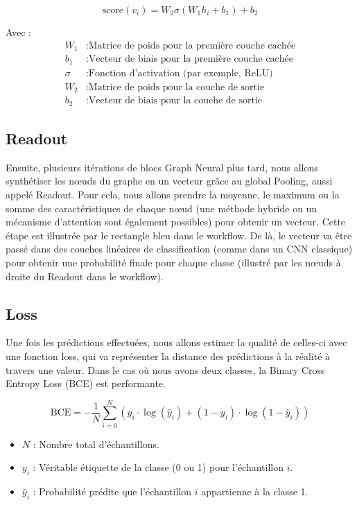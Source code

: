 \documentclass{article}
\begin{document}
\[
\text{score}(v_i) = W_2 \sigma(W_1 h_i + b_1) + b_2
\]

Avec :
\begin{align*}
W_1 & : \text{Matrice de poids pour la première couche cachée} \\
b_1 & : \text{Vecteur de biais pour la première couche cachée} \\
\sigma & : \text{Fonction d'activation (par exemple, ReLU)} \\
W_2 & : \text{Matrice de poids pour la couche de sortie} \\
b_2 & : \text{Vecteur de biais pour la couche de sortie}
\end{align*}

\subsection{Readout}
Ensuite, plusieurs itérations de blocs Graph Neural plus tard, nous allons synthétiser les nœuds du graphe en un vecteur grâce au global Pooling, aussi appelé Readout. Pour cela, nous allons prendre la moyenne, le maximum ou la somme des caractéristiques de chaque nœud (une méthode hybride ou un mécanisme d’attention sont également possibles) pour obtenir un vecteur. Cette étape est illustrée par le rectangle bleu dans le workflow. De là, le vecteur va être passé dans des couches linéaires de classification (comme dans un CNN classique) pour obtenir une probabilité finale pour chaque classe (illustré par les nœuds à droite du Readout dans le workflow).

\subsection{Loss}
Une fois les prédictions effectuées, nous allons estimer la qualité de celles-ci avec une fonction loss, qui va représenter la distance des prédictions à la réalité à travers une valeur. Dans le cas où nous avons deux classes, la Binary Cross Entropy Loss (BCE) est performante.

\[
\text{BCE} = -\frac{1}{N} \sum_{i=0}^{N} \left( y_i \cdot \log(\hat{y}_i) + (1 - y_i) \cdot \log(1 - \hat{y}_i) \right)
\]

\begin{itemize}
    \item \( N \) : Nombre total d'échantillons.
    \item \( y_i \) : Véritable étiquette de la classe (0 ou 1) pour l'échantillon \( i \).
    \item \( \hat{y}_i \) : Probabilité prédite que l'échantillon \( i \) appartienne à la classe 1.
\end{itemize}
\end{document}
